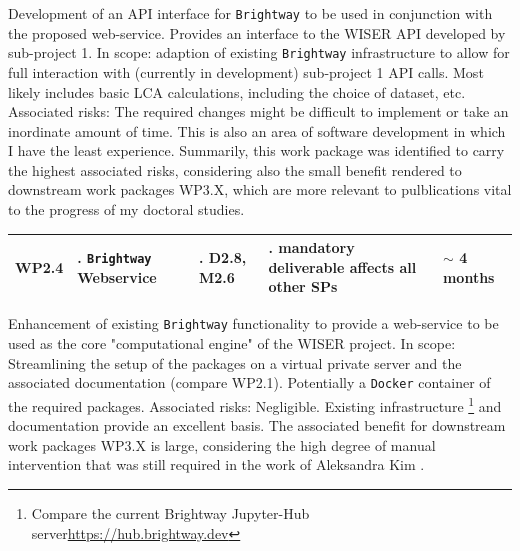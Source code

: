 \documentclass{article}
\begin{document}
    Development of an API interface for \texttt{Brightway} to be used in conjunction with the proposed web-service. Provides an interface to the WISER API developed by sub-project 1. In scope: adaption of existing \texttt{Brightway} infrastructure to allow for full interaction with (currently in development) sub-project 1 API calls. Most likely includes basic LCA calculations, including the choice of dataset, etc. Associated risks: The required changes might be difficult to implement or take an inordinate amount of time. This is also an area of software development in which I have the least experience. Summarily, this work package was identified to carry the highest associated risks, considering also the small benefit rendered to downstream work packages WP3.X, which are more relevant to pulblications vital to the progress of my doctoral studies.
    
    \begin{table}[H]
        \centering
        \begin{tabularx}{\linewidth}{
            |>{\hsize=0.25\hsize}X
            |>{\hsize=1.\hsize}X
            |>{\hsize=1.\hsize}X
            |>{\hsize=1.\hsize}X
            |>{\hsize=0.75\hsize}X|
          } %
            \hline
                WP2.4
            &
                \texttt{Brightway} Webservice
            &
                D2.8, M2.6
            &
                mandatory deliverable \newline affects all other SPs 
            &
                $\sim$ 4 months
            \\
            \hline
        \end{tabularx}
    \end{table}
    \vspace*{-9pt}
    
    Enhancement of existing \texttt{Brightway} functionality to provide a web-service to be used as the core "computational engine" of the WISER project. In scope: Streamlining the setup of the packages on a virtual private server and the associated documentation (compare WP2.1). Potentially a \texttt{Docker} container of the required packages. Associated risks: Negligible. Existing infrastructure \footnote{Compare the current Brightway Jupyter-Hub server\url{https://hub.brightway.dev}} and documentation provide an excellent basis. The associated benefit for downstream work packages WP3.X is large, considering the high degree of manual intervention that was still required in the work of Aleksandra Kim \cite{paulillo_influential_2021}.
\end{document}
